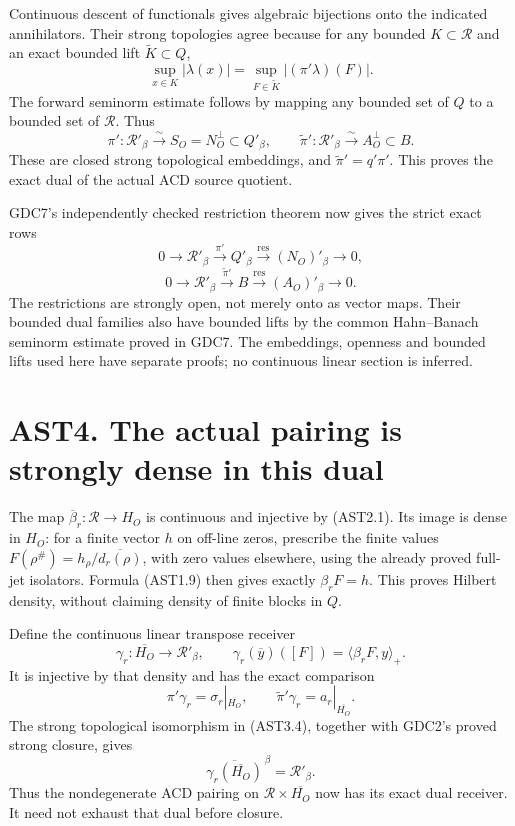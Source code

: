 Continuous descent of functionals gives algebraic bijections onto the
indicated annihilators. Their strong topologies agree because for any
bounded \(K\subset\mathcal R\) and an exact bounded lift
\(\widetilde K\subset Q\), \[
\sup_{x\in K}|\lambda(x)|
=\sup_{F\in\widetilde K}|(\pi'\lambda)(F)|.
\tag{AST3.3}
\] The forward seminorm estimate follows by mapping any bounded set of
\(Q\) to a bounded set of \(\mathcal R\). Thus \[
\boxed{\pi':\mathcal R'_\beta\xrightarrow{\sim}S_O=N_O^\perp
\subset Q'_\beta,\qquad
\widetilde\pi':\mathcal R'_\beta\xrightarrow{\sim}A_O^\perp
\subset B.}
\tag{AST3.4}
\] These are closed strong topological embeddings, and
\(\widetilde\pi'=q'\pi'\). This proves the exact dual of the actual ACD
source quotient.

GDC7's independently checked restriction theorem now gives the strict
exact rows \[
0\to\mathcal R'_\beta\xrightarrow{\pi'}Q'_\beta
\xrightarrow{\mathrm{res}}(N_O)'_\beta\to0,
\] \[
0\to\mathcal R'_\beta\xrightarrow{\widetilde\pi'}B
\xrightarrow{\mathrm{res}}(A_O)'_\beta\to0.
\tag{AST3.5}
\] The restrictions are strongly open, not merely onto as vector maps.
Their bounded dual families also have bounded lifts by the common
Hahn--Banach seminorm estimate proved in GDC7. The embeddings, openness
and bounded lifts used here have separate proofs; no continuous linear
section is inferred.

\section{AST4. The actual pairing is strongly dense in this
dual}\label{ast4.-the-actual-pairing-is-strongly-dense-in-this-dual}

The map \(\overline\beta_r:\mathcal R\to H_O\) is continuous and
injective by (AST2.1). Its image is dense in \(H_O\): for a finite
vector \(h\) on off-line zeros, prescribe the finite values
\(F(\rho^\#)=h_\rho/\overline{d_r(\rho)}\), with zero values elsewhere,
using the already proved full-jet isolators. Formula (AST1.9) then gives
exactly \(\beta_rF=h\). This proves Hilbert density, without claiming
density of finite blocks in \(Q\).

Define the continuous linear transpose receiver \[
\gamma_r:\overline{H_O}\to\mathcal R'_\beta,
\qquad
\gamma_r(\overline y)([F])=\langle\beta_rF,y\rangle_+.
\tag{AST4.1}
\] It is injective by that density and has the exact comparison \[
\pi'\gamma_r=\sigma_r|_{\overline{H_O}},\qquad
\widetilde\pi'\gamma_r=a_r|_{\overline{H_O}}.
\tag{AST4.2}
\] The strong topological isomorphism in (AST3.4), together with GDC2's
proved strong closure, gives \[
\overline{\gamma_r(\overline{H_O})}^{\,\beta}=\mathcal R'_\beta.
\tag{AST4.3}
\] Thus the nondegenerate ACD pairing on
\(\mathcal R\times\overline{H_O}\) now has its exact dual receiver. It
need not exhaust that dual before closure.

